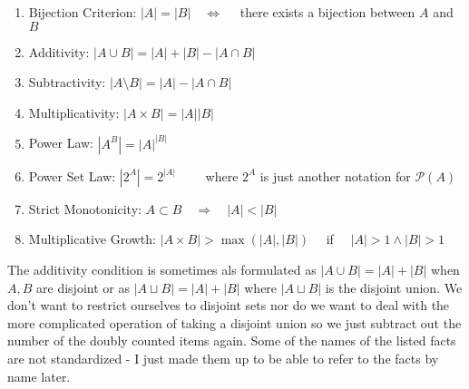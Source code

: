\documentclass[12pt]{article}
\begin{document}
\begin{enumerate}
  \item Bijection Criterion: $|A| = |B| \quad  \Leftrightarrow  \quad$ there exists a bijection between $A$ and $B$
  \item Additivity: $|A \cup B| = |A| + |B| - |A \cap B|$ 
  \item Subtractivity:  $|A \setminus B| = |A| - |A \cap B|$ 
  \item Multiplicativity:  $|A \times B| = |A| |B|$ 
  \item Power Law: $|A^B| = |A|^{|B|}$
  \item Power Set Law: $|2^A| = 2^{|A|} \qquad$  where $2^A$ is just another notation for $\mathcal{P}(A)$
  \item Strict Monotonicity: $A \subset B \quad \Rightarrow \quad |A| < |B|$
  \item Multiplicative Growth: $|A \times B| > \max(|A|,|B|) \quad$ if $\quad |A| > 1 \wedge |B| > 1$
\end{enumerate}
The additivity condition is sometimes als formulated as $|A \cup B| = |A| + |B|$ when $A,B$ are disjoint or as $|A \sqcup B| = |A| + |B|$ where $|A \sqcup B|$ is the disjoint union. We don't want to restrict ourselves to disjoint sets nor do we want to deal with the more complicated operation of taking a disjoint union so we just subtract out the number of the doubly counted items again. Some of the names of the listed facts are not standardized - I just made them up to be able to refer to the facts by name later.

\end{document}
